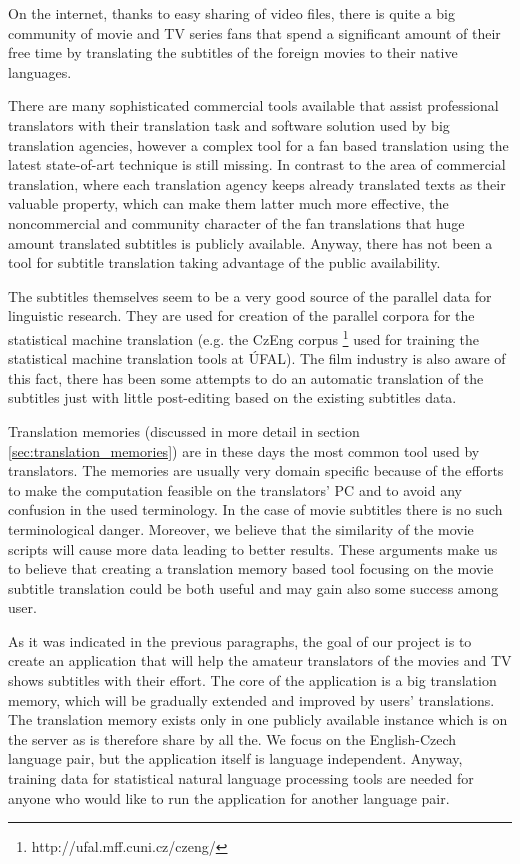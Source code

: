 On the internet, thanks to easy sharing of video files, there is quite a big community of movie and TV series fans that spend a significant amount of their free time by translating the subtitles of the foreign movies to their native languages. 

There are many sophisticated commercial tools available that assist professional translators with their translation task and software solution used by big translation agencies, however a complex tool for a fan based translation using the latest state-of-art technique is still missing. In contrast to the area of commercial translation, where each translation agency keeps already translated texts as their valuable property, which can make them latter much more effective, the noncommercial and community character of the fan translations that huge amount translated subtitles is publicly available. Anyway, there has not been a tool for subtitle translation taking advantage of the public availability.

The subtitles themselves seem to be a very good source of the parallel data for linguistic research. They are used for creation of the parallel corpora for the statistical machine translation (e.g. the CzEng corpus \footnote{http://ufal.mff.cuni.cz/czeng/} used for training the statistical machine translation tools at ÚFAL). The film industry is also aware of this fact, there has been some attempts to do an automatic translation of the subtitles just with little post-editing based on the existing subtitles data.

Translation memories (discussed in more detail in section \ref{sec:translation_memories}) are in these days the most common tool used by translators. The memories are usually very domain specific because of the efforts to make the computation feasible on the translators' PC and to avoid any confusion in the used terminology. In the case of movie subtitles there is no such terminological danger. Moreover, we believe that the similarity of the movie scripts will cause more data leading to better results. These arguments make us to believe that creating a translation memory based tool focusing on the movie subtitle translation could be both useful and may gain also some success among user.

As it was indicated in the previous paragraphs, the goal of our project is to create an application that will help the amateur translators of the movies and TV shows subtitles with their effort. The core of the application is a big translation memory, which will be gradually extended and improved by users' translations. The translation memory exists only in one publicly available instance which is on the server as is therefore share by all the. We focus on the English-Czech language pair, but the application itself is language independent. Anyway, training data for statistical natural language processing tools are needed for anyone who would like to run the application for another language pair.

